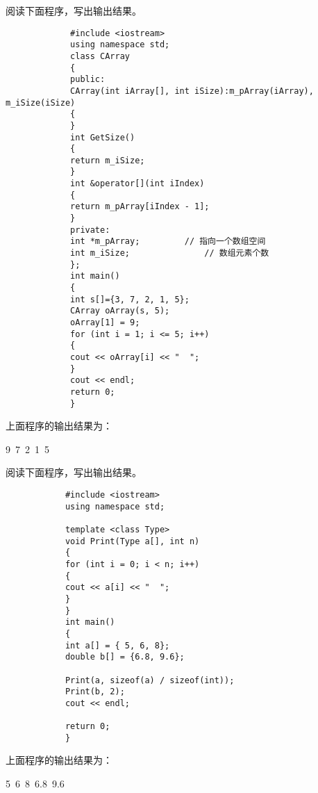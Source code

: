 \documentclass[sealed,answers,prescorebox]{nwsuafexam}%
\begin{document}
\begin{questions}
	    \question
	    阅读下面程序，写出输出结果。
	    \begin{flushleft}
	    	\wuhao
	    	 \begin{verbatim}
	    	 #include <iostream>
	    	 using namespace std;
	    	 class CArray
	    	 {
	    	 public:
	    	 CArray(int iArray[], int iSize):m_pArray(iArray), m_iSize(iSize)
	    	 {
	    	 }
	    	 int GetSize()
	    	 {
	    	 return m_iSize;
	    	 }
	    	 int &operator[](int iIndex)
	    	 {
	    	 return m_pArray[iIndex - 1];
	    	 }
	    	 private:
	    	 int *m_pArray;			// 指向一个数组空间
	    	 int m_iSize;				// 数组元素个数
	    	 };
	    	 int main()
	    	 {
	    	 int s[]={3, 7, 2, 1, 5};
	    	 CArray oArray(s, 5);
	    	 oArray[1] = 9;
	    	 for (int i = 1; i <= 5; i++)
	    	 {
	    	 cout << oArray[i] << "  ";
	    	 }
	    	 cout << endl;
	    	 return 0;
	    	 }
	    	 \end{verbatim}
	    \end{flushleft}
	    上面程序的输出结果为：
	    \begin{Answers}[1]
	    	9~7~2~1~5
	    \end{Answers}
	    
	    \question
	    阅读下面程序，写出输出结果。
	    \begin{flushleft}
	    	\wuhao
		    \begin{verbatim}
	    	#include <iostream>
	    	using namespace std;
	    	
	    	template <class Type>
	    	void Print(Type a[], int n)
	    	{
	    	for (int i = 0; i < n; i++)
	    	{
	    	cout << a[i] << "  ";
	    	}
	    	}
	    	int main()
	    	{
	    	int a[] = { 5, 6, 8};
	    	double b[] = {6.8, 9.6};
	    	
	    	Print(a, sizeof(a) / sizeof(int));
	    	Print(b, 2);
	    	cout << endl;
	    	
	    	return 0;
	    	}
		    \end{verbatim}
		\end{flushleft}
	    上面程序的输出结果为：
	    \begin{Answers}[1]
	    	5~6~8~6.8~9.6
	    \end{Answers}
	    

\end{questions}
\end{document}
